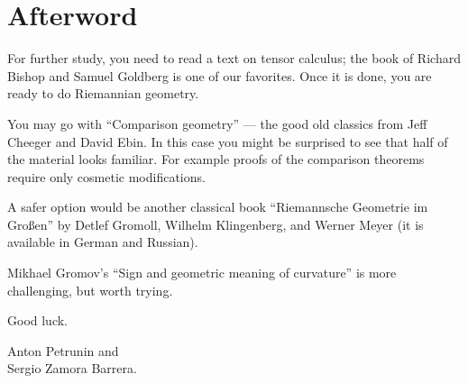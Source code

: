 \chapter*{Afterword}



For further study, you need to read a text on tensor calculus;
the book of Richard Bishop and Samuel Goldberg \cite{bishop-goldberg} is one of our favorites.
Once it is done, you are ready to do Riemannian geometry.

You may go with  ``Comparison geometry'' \cite{cheeger-ebin} --- the good old classics from Jeff Cheeger and David Ebin. 
In this case you might be surprised to see that half of the material looks familiar.
For example proofs of the comparison theorems require only cosmetic modifications.

A safer option would be another classical book ``Riemannsche Geometrie im Großen'' \cite{gromoll-klingenberg-meyer} by 
Detlef Gromoll,
Wilhelm Klingenberg, 
and  Werner Meyer (it is available in German and Russian).

Mikhael Gromov's ``Sign and geometric meaning of curvature'' \cite{gromov-1991} is more challenging, but worth trying. 

Good luck.

\begin{flushright}
Anton Petrunin and\\
Sergio Zamora Barrera.
\end{flushright}
